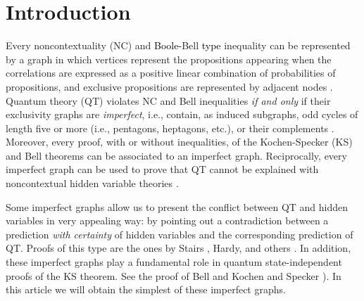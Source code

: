 \documentclass[%
  twocolumn,
 showpacs,
 showkeys,
 preprintnumbers,
 amsmath,amssymb,
 aps,
  pra,
  longbibliography,
 floatfix,
 ]{revtex4-1}
\newcommand{\karl}[1]{\textcolor{black}{#1}}
\begin{document}


\maketitle


\section{Introduction}


Every noncontextuality (NC) \cite{KCBS08,Cabello08} and \karl{Boole-}Bell \karl{type} inequality \cite{Bell64}
can be represented by a graph in which vertices represent the propositions appearing
when the correlations are expressed as a positive linear combination of probabilities of propositions,
and exclusive propositions are represented by adjacent nodes \cite{CSW10,CSW14}.
Quantum theory (QT) violates NC and Bell inequalities {\em if and only}
if their exclusivity graphs are {\em imperfect}, i.e.,
contain, as induced subgraphs, odd cycles of length five or more (i.e., pentagons, heptagons, etc.),
or their complements \cite{CSW10,CSW14,CDLP13}.
Moreover, every proof, with or without inequalities, of the Kochen-Specker (KS)  \cite{Specker60,KS65,KS67}
and Bell \cite{Bell66} theorems can be associated to an imperfect graph.
Reciprocally, every imperfect graph can be used to prove that QT
cannot be explained with noncontextual hidden variable theories \cite{CSW10,CSW14}.

Some imperfect graphs allow us to present the conflict between QT and hidden variables in very appealing way:
by pointing out a contradiction between a prediction {\em with certainty} of hidden variables and the corresponding prediction of QT.
Proofs of this type are the ones by Stairs \cite{Stairs83}, Hardy, and others \cite{}.
In addition, these imperfect graphs play a fundamental role in quantum state-independent proofs of the KS theorem.
See the proof of Bell \cite{Bell66} and Kochen and Specker \cite{KS67}).
In this article we will obtain the simplest of these imperfect graphs.
\end{document}
